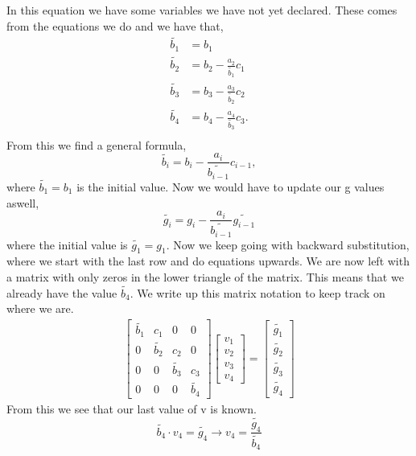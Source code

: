 \documentclass[english,notitlepage]{revtex4-1}  %
\begin{document}
 In this equation we have some variables we have not yet declared. These comes from the equations we do and we have that,
 \begin{align}
 \tilde{b_1} &= b_1\\
 \tilde{b_2} &= b_2 - \frac{a_2}{\tilde{b_1}}c_1\\
 \tilde{b_3} &= b_3 - \frac{a_3}{\tilde{b_2}}c_2\\
 \tilde{b_4} &= b_4 - \frac{a_4}{\tilde{b_3}}c_3.\\
 \end{align}
 From this we find a general formula,
\begin{equation}
  \tilde{b_i} = b_i - \frac{a_i}{\tilde{b_{i-1}}}c_{i - 1},
\end{equation}
 where $ \tilde{b_1} = b_1$ is the initial value.
 Now we would have to update our g values aswell,
 \begin{equation}
 \tilde{g_i} = g_i - \frac{a_i}{\tilde{b_{i-1}}}\tilde{g_{i-1}}
 \end{equation}
where the initial value is $\tilde{g_1} = g_1$.
Now we keep going with backward substitution, where we start with the last row and do equations upwards. We are now left with a matrix with only zeros in the lower triangle of the matrix. This means that we already have the value $\tilde{b_4}$. We write up this matrix notation to keep track on where we are.
\begin{align*}
 \begin{bmatrix}
 \tilde{b_1} & c_1 & 0 & 0 \\
 0 & \tilde{b_2} & c_2 & 0 \\
 0 & 0 & \tilde{b_3} & c_3 \\
 0 & 0 & 0 & \tilde{b_4}
 \end{bmatrix} \begin{bmatrix}
 v_1\\
 v_2\\
 v_3\\
 v_4
 \end{bmatrix} = \begin{bmatrix}
 \tilde{g_1}\\
 \tilde{g_2}\\
 \tilde{g_3}\\
 \tilde{g_4}
 \end{bmatrix}
\end{align*}
From this we see that our last value of v is known.
\begin{equation}
\tilde{b_4} \cdot v_4 = \tilde{g_4} \rightarrow v_4 = \frac{\tilde{g_4}}{\tilde{b_4}}
\end{equation}
\end{document}

